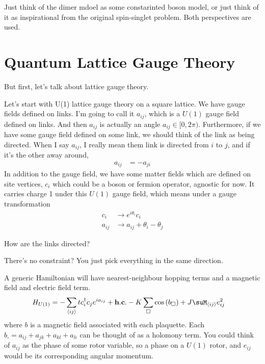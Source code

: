 Just think of the dimer mdoel as some constarinted boson model,
or just think of it as inspirational from the original spin-singlet problem.
Both perspectives are used.

\section{Quantum Lattice Gauge Theory}
But first,
let's talk about lattice gauge theory.

Let's start with U(1) lattice gauge theory on a square lattice.
We have gauge fields defined on links.
I'm going to call it $a_{ij}$,
which is a $U(1)$ gauge field defined on links.
And then $a_{ij}$ is actually an angle $a_{ij}\in [0,2\pi)$.
Furthermore,
if we have some gauge field defined on some link,
we should think of the link as being directed.
When I say $a_{ij}$,
I really mean them link is directed from $i$ to $j$,
and if it's the other away around,
\begin{align}
    a_{ij} &= -a_{ji}
\end{align}
In addition  to the gauge field,
we have some matter fields which are defined on site vertices,
$c_i$ which could be a boson or fermion operator,
agnostic for now.
It carries charge 1 under this $U(1)$ gauge field,
which means under a gauge transformation
\begin{align}
    c_i &\to e^{i\theta_i} c_i\\
    a_{ij} &\to a_{ij} + \theta_i - \theta_j
\end{align}

\begin{question}
    How are the links directed?
\end{question}
There's no constraint?
You just pick everything in the same direction.

A generic Hamiltonian will have nearest-neighbour hopping terms
and a magnetic field and electric field term.
\begin{align}
    H_{U(1)}
    &=
    -\sum_{\langle ij \rangle}
    t c_i^\dagger c_j e^{ia_{ij}} + \mathbf{h.c.}
    - K
    \sum_{\square}
    \cos\left( b_{\square} \right)
    +
    J
    \suM_{\langle ij \rangle} e_{ij}^2
\end{align}
where $b$ is a magnetic field associated with each plaquette.
Each $b_{\square} =
a_{ij} + a_{jk} + a_{kl} + a_{li}$
can be thought of as a holomony term.
You could think of $a_{ij}$ as the phase of some rotor variable,
so a phase on a $U(1)$ rotor,
and $e_{ij}$ would be its corresponding angular momentum.


